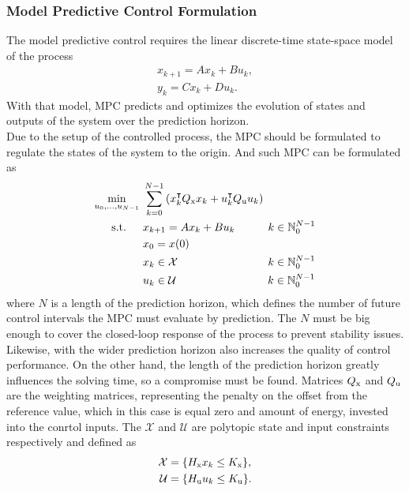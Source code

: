 \subsubsection{Model Predictive Control Formulation}
The model predictive control requires the linear discrete-time state-space model of the process
\begin{subequations}\label{linmodel}
	\begin{align}	
	x_{k+1} = Ax_k + Bu_k,\\
	y_k = Cx_k + Du_k.
	\end{align}
\end{subequations}
With that model, MPC predicts and optimizes the evolution of states and outputs of the system over the prediction horizon.\\
Due to the setup of the controlled process, the MPC should be formulated to regulate the states of the system to the origin. And such MPC can be formulated as
\begin{subequations}\label{mpcgeneral}
	\begin{align}
		\min_{u_0,...,u_{N-1}}\ &\sum_{k=0}^{N-1} \left(  x_{k}^\intercal Q _{\text{x}}x_{k}+u_{k}^\intercal Q _{\text{u}}u_{k} \right)\\
	    \label{eq217b}\text{s.t.}\quad\,\ &x_{k+1} = Ax_{k} + Bu_{k}\qquad\quad  k \in \mathbb{N}_0^{N-1}\\
		&x_0 = x(0)\\
		\label{cst_x}&x_{k}\in\mathcal{X}\qquad\qquad\qquad\qquad\,  k \in \mathbb{N}_0^{N-1}\\
		\label{cst_u}&u_{k}\in\mathcal{U}\qquad\qquad\qquad\qquad\;   k \in \mathbb{N}_0^{N-1}
	\end{align}
\end{subequations}
where $N$ is a length of the prediction horizon, which defines the number of future control intervals the MPC must evaluate by prediction. The $N$ must be big enough to cover the closed-loop response of the process to prevent stability issues. Likewise, with the wider prediction horizon also increases the quality of control performance. On the other hand, the length of the prediction horizon greatly influences the solving time, so a compromise must be found. Matrices $Q _{\text{x}}$ and $Q _{\text{u}}$ are the weighting matrices, representing the penalty on the offset from the reference value, which in this case is equal zero and amount of energy, invested into the conrtol inputs. The $\mathcal{X}$ and $\mathcal{U}$ are polytopic state and input constraints respectively and defined as
\begin{subequations}
	\begin{align}
	\mathcal{X} &= \{H _{\text{x}}x_k\leq K _{\text{x}}\},\\
	\mathcal{U} &= \{H _{\text{u}}u_k\leq K _{\text{u}}\}.
	\end{align}
\end{subequations}
